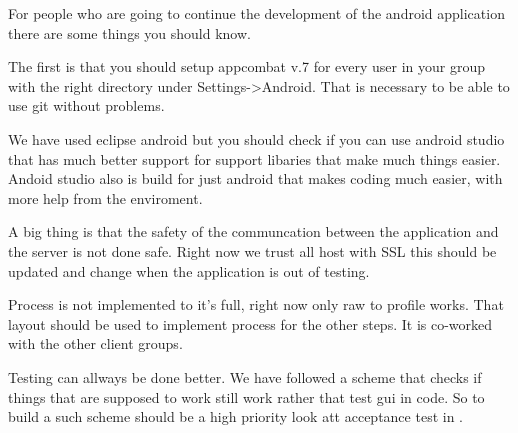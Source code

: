 For people who are going to continue the development of the android application there are some things you should know.

The first is that you should setup appcombat v.7 for every user in your group with the right directory under Settings->Android. That is necessary to be able to use git without problems. 

We have used eclipse android but you should check if you can use android studio that has much better support for support libaries that make much things easier. Andoid studio also is build for just android that makes coding much easier, with more help from the enviroment.

A big thing is that the safety of the communcation between the application and the server is not done safe. Right now we trust all host with SSL this should be updated and change when the application is out of testing. 

Process is not implemented to it's full, right now only raw to profile works. That layout should be used to implement process for the other steps. It is co-worked with the other client groups.

Testing can allways be done better. We have followed a scheme that checks if things that are supposed to work still work rather that test gui in code. So to build  a such scheme should be a high priority look att acceptance test in . 


